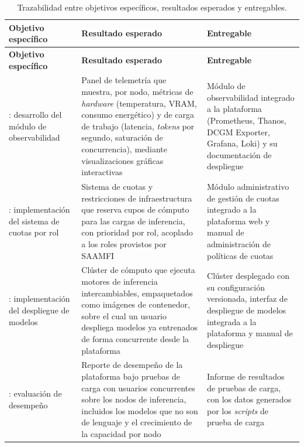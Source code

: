 \begin{xltabular}{\textwidth}{p{0.18\textwidth} X X}
        \caption{Trazabilidad entre objetivos específicos, resultados esperados y entregables.}
        \label{tab:objetivos-entregables} \\
        \toprule
        \textbf{Objetivo específico} & \textbf{Resultado esperado} & \textbf{Entregable} \\
        \midrule
        \endfirsthead
        \toprule
        \textbf{Objetivo específico} & \textbf{Resultado esperado} & \textbf{Entregable} \\
        \midrule
        \endhead
        \bottomrule
        \endfoot
        : desarrollo del módulo de observabilidad &
        Panel de telemetría que muestra, por nodo, métricas de \emph{hardware} (temperatura, VRAM, consumo energético) y de carga de trabajo (latencia, \emph{tokens} por segundo, saturación de concurrencia), mediante visualizaciones gráficas interactivas &
        Módulo de observabilidad integrado a la plataforma (Prometheus, Thanos, DCGM Exporter, Grafana, Loki) y su documentación de despliegue \\
        \addlinespace
        : implementación del sistema de cuotas por rol &
        Sistema de cuotas y restricciones de infraestructura que reserva cupos de cómputo para las cargas de inferencia, con prioridad por rol, acoplado a los roles provistos por SAAMFI &
        Módulo administrativo de gestión de cuotas integrado a la plataforma web y manual de administración de políticas de cuotas \\
        \addlinespace
        : implementación del despliegue de modelos &
        Clúster de cómputo que ejecuta motores de inferencia intercambiables, empaquetados como imágenes de contenedor, sobre el cual un usuario despliega modelos ya entrenados de forma concurrente desde la plataforma &
        Clúster desplegado con su configuración versionada, interfaz de despliegue de modelos integrada a la plataforma y manual de despliegue \\
        \addlinespace
        : evaluación de desempeño &
        Reporte de desempeño de la plataforma bajo pruebas de carga con usuarios concurrentes sobre los nodos de inferencia, incluidos los modelos que no son de lenguaje y el crecimiento de la capacidad por nodo &
        Informe de resultados de pruebas de carga, con los datos generados por los \emph{scripts} de prueba de carga \\
\end{xltabular}

